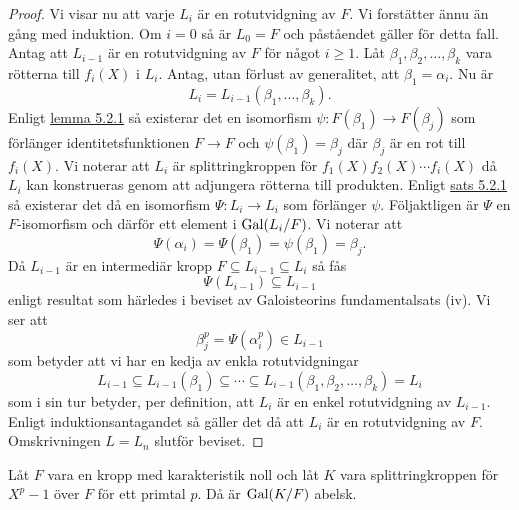 \documentclass{article}
\newcommand{\gal}[0]{\textnormal{Gal}}
\theoremstyle{definition}
\begin{document}
\begin{proof}
  Vi visar nu att varje $L_i$ är en rotutvidgning av $F$. Vi forstätter ännu än gång med induktion. Om $i = 0$ så är $L_0 = F$
  och påståendet gäller för detta fall. Antag att $L_{i-1}$ är en rotutvidgning av $F$ för något $i \geq 1$. Låt $\beta_1, \beta_2, \ldots, \beta_k$
  vara rötterna till $f_i(X)$ i $L_i$. Antag, utan förlust av generalitet, att $\beta_1 = \alpha_i$. Nu är 
  \[L_i = L_{i-1}(\beta_1, \ldots, \beta_k).\]
  Enligt \hyperlink{6.0.2}{lemma 5.2.1} så existerar det en isomorfism $\psi: F(\beta_1) \rightarrow F(\beta_j)$ som förlänger 
  identitetsfunktionen $F \rightarrow F$ och $\psi(\beta_1) = \beta_j$
  där $\beta_j$ är en rot till $f_i(X)$. Vi noterar att $L_i$ är splittringkroppen för $f_1(X)f_2(X) \cdots f_i(X)$
  då $L_i$ kan konstrueras genom att adjungera rötterna till produkten. Enligt \hyperlink{sats6.0.1}{sats 5.2.1} så existerar det då 
  en isomorfism $\Psi: L_i \rightarrow L_i$ som förlänger $\psi$. Följaktligen är $\Psi$ en $F$-isomorfism och därför ett element i $\gal(L_i/F)$.
  Vi noterar att 
  \[\Psi(\alpha_i) = \Psi(\beta_1) = \psi(\beta_1) = \beta_j.\]
  Då $L_{i-1}$ är en intermediär kropp $F \subseteq L_{i-1} \subseteq L_i$ så fås 
  \[\Psi(L_{i-1}) \subseteq L_{i-1}\]
  enligt resultat som härledes i beviset av Galoisteorins fundamentalsats (iv). Vi ser att 
  \[\beta_j^p = \Psi(\alpha_i^p) \in L_{i-1}\]
  som betyder att vi har en kedja av enkla rotutvidgningar 
  \[L_{i-1} \subseteq L_{i-1} (\beta_1) \subseteq \cdots \subseteq L_{i-1}(\beta_1, \beta_2, \ldots, \beta_k) = L_i\]
  som i sin tur betyder, per definition, att $L_{i}$ är en enkel rotutvidgning av $L_{i-1}$. Enligt induktionsantagandet så 
  gäller det då att $L_i$ är en rotutvidgning av $F$. Omskrivningen $L = L_n$ slutför beviset. 
\end{proof}

\hypertarget{lemma10.0.3}{}
\begin{mylemma}{}{}
  Låt $F$ vara en kropp med karakteristik noll och låt $K$ vara splittringkroppen för $X^p -1$ över $F$ för ett primtal $p$. Då är 
  $\gal(K/F)$ abelsk.
\end{mylemma}
\end{document}
